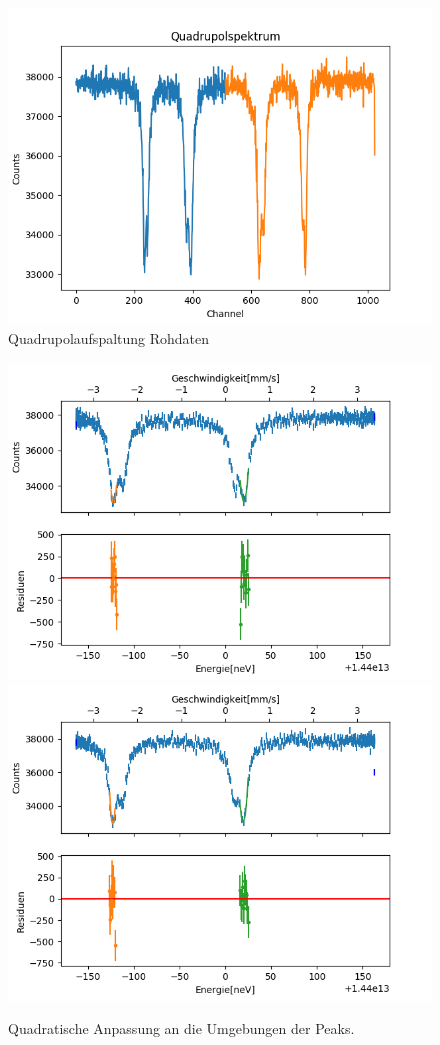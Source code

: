 \documentclass[12pt,a4paper]{article}
\begin{document}
\begin{figure}[H]
\centering
\includegraphics[scale=0.8]{Bilder/Quadrupol/Quad_Roh.png}
\caption{Quadrupolaufspaltung Rohdaten}
\label{fig:Quad_Roh}
\end{figure}

\begin{figure}[H]
\centering
\includegraphics[scale=0.8]{Bilder/Quadrupol/Quad_fit_vor.png}
\includegraphics[scale=0.8]{Bilder/Quadrupol/Quad_fit_nach.png}
\caption{Quadratische Anpassung an die Umgebungen der Peaks.}
\label{fig:Quad_fit}
\end{figure}
\end{document}
